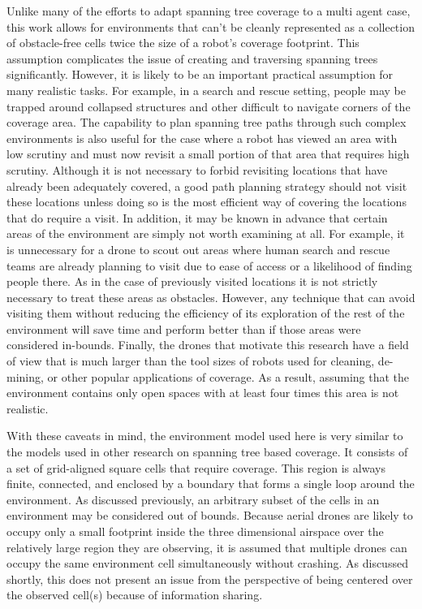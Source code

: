 Unlike many of the efforts to adapt spanning tree coverage to a multi agent case, this work allows for environments that can't be cleanly represented as a collection of obstacle-free cells twice the size of a robot's coverage footprint. This assumption complicates the issue of creating and traversing spanning trees significantly. However, it is likely to be an important practical assumption for many realistic tasks. For example, in a search and rescue setting, people may be trapped around collapsed structures and other difficult to navigate corners of the coverage area. The capability to plan spanning tree paths through such complex environments is also useful for the case where a robot has viewed an area with low scrutiny and must now revisit a small portion of that area that requires high scrutiny. Although it is not necessary to forbid revisiting locations that have already been adequately covered, a good path planning strategy should not visit these locations unless doing so is the most efficient way of covering the locations that do require a visit. In addition, it may be known in advance that certain areas of the environment are simply not worth examining at all. For example, it is unnecessary for a drone to scout out areas where human search and rescue teams are already planning to visit due to ease of access or a likelihood of finding people there. As in the case of previously visited locations it is not strictly necessary to treat these areas as obstacles. However, any technique that can avoid visiting them without reducing the efficiency of its exploration of the rest of the environment will save time and perform better than if those areas were considered in-bounds. Finally, the drones that motivate this research have a field of view that is much larger than the tool sizes of robots used for cleaning, de-mining, or other popular applications of coverage. As a result, assuming that the environment contains only open spaces with at least four times this area is not realistic.

With these caveats in mind, the environment model used here is very similar to the models used in other research on spanning tree based coverage. It consists of a set of grid-aligned square cells that require coverage. This region is always finite, connected, and enclosed by a boundary that forms a single loop around the environment. As discussed previously, an arbitrary subset of the cells in an environment may be considered out of bounds. Because aerial drones are likely to occupy only a small footprint inside the three dimensional airspace over the relatively large region they are observing, it is assumed that multiple drones can occupy the same environment cell simultaneously without crashing. As discussed shortly, this does not present an issue from the perspective of being centered over the observed cell(s) because of information sharing.

